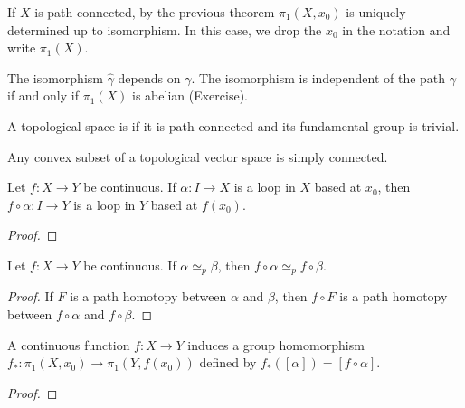\begin{remark}
    If $X$ is path connected, by the previous theorem $\pi_1(X,x_0)$ is uniquely determined up to isomorphism. In this case, we drop the $x_0$ in the notation and write $\pi_1(X)$.
\end{remark}

\begin{remark}
    The isomorphism $\widehat{\gamma}$ depends on $\gamma$. The isomorphism is independent of the path $\gamma$ if and only if $\pi_1(X)$ is abelian (Exercise).
\end{remark}

\begin{definition}
    A topological space is  if it is path connected and its fundamental group is trivial.
\end{definition}

\begin{example}
    Any convex subset of a topological vector space is simply connected.
\end{example}

\begin{lemma}
    Let $f:X \rightarrow Y$ be continuous. If $\alpha:I \rightarrow X$ is a loop in $X$ based at $x_0$, then $f \circ \alpha:I \rightarrow Y$ is a loop in $Y$ based at $f(x_0)$.
\end{lemma}
    {\color{red} \begin{proof}
        
    \end{proof}}

\begin{lemma}
    Let $f:X \rightarrow Y$ be continuous. If $\alpha \simeq_p \beta$, then $f \circ \alpha \simeq_p f \circ \beta$.
\end{lemma}
    \begin{proof}
        If $F$ is a path homotopy between $\alpha$ and $\beta$, then $f \circ F$ is a path homotopy between $f \circ \alpha$ and $f \circ \beta$.
    \end{proof}

\begin{theorem}
    A continuous function $f:X \rightarrow Y$ induces a group homomorphism $f_\ast:\pi_1(X,x_0) \rightarrow \pi_1(Y,f(x_0))$ defined by $f_\ast([\alpha]) = [f \circ \alpha]$.
\end{theorem}
    {\color{red} \begin{proof}
        
    \end{proof}}

